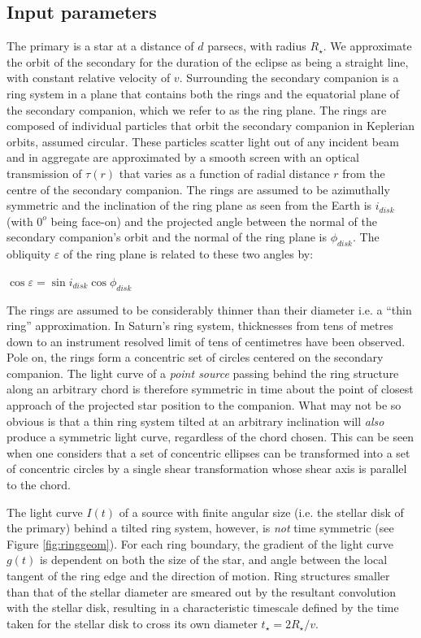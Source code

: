 \documentclass{emulateapj}
\newcommand{\id}{i_{disk}}
\newcommand{\pd}{\phi_{disk}}
\newcommand{\taur}{\tau(r)}
\begin{document}
\subsection{Input parameters}

The primary is a star at a distance of $d$ parsecs, with radius
$R_\star$.
We approximate the orbit of the secondary for the duration of the
eclipse as being a straight line, with constant relative velocity of
$v$.
Surrounding the secondary companion is a ring system in a plane that
contains both the rings and the equatorial plane of the secondary
companion, which we refer to as the ring plane.
The rings are composed of individual particles that orbit the
secondary companion in Keplerian orbits, assumed circular.
These particles scatter light out of any incident beam and in aggregate
are approximated by a smooth screen with an optical transmission of
$\taur$ that varies as a function of radial distance $r$ from the centre
of the secondary companion.
The rings are assumed to be azimuthally symmetric and the inclination
of the ring plane as seen from the Earth is $\id$ (with $0^o$ being
face-on) and the projected angle between the normal of the secondary
companion's orbit and the normal of the ring plane is $\pd$.
The obliquity $\varepsilon$ of the ring plane is related to these two
angles by:

$\cos \varepsilon = \sin \id \cos \pd$

The rings are assumed to be considerably thinner than their diameter
i.e. a ``thin ring'' approximation.
In Saturn's ring system, thicknesses from tens of metres
down to an instrument resolved limit of tens of centimetres
\citep{Tiscareno13} have been observed.
Pole on, the rings form a concentric set of circles centered on the
secondary companion.
The light curve of a {\em point source} passing behind the ring
structure along an arbitrary chord is therefore symmetric in time
about the point of closest approach of the projected star position to
the companion.
What may not be so obvious is that a thin ring system tilted at an
arbitrary inclination will {\em also} produce a symmetric light curve,
regardless of the chord chosen.
This can be seen when one considers that a set of concentric ellipses
can be transformed into a set of concentric circles by a single shear
transformation whose shear axis is parallel to the chord.

The light curve $I(t)$ of a source with finite angular size (i.e. the
stellar disk of the primary) behind a tilted ring system, however, is
{\em not} time symmetric (see Figure \ref{fig:ringgeom}).
For each ring boundary, the gradient of the light curve $g(t)$ is
dependent on both the size of the star, and angle between the local
tangent of the ring edge and the direction of motion.
Ring structures smaller than that of the stellar diameter are smeared
out by the resultant convolution with the stellar disk, resulting in a
characteristic timescale defined by the time taken for the stellar
disk to cross its own diameter $t_\star=2R_\star/v$.
\end{document}
